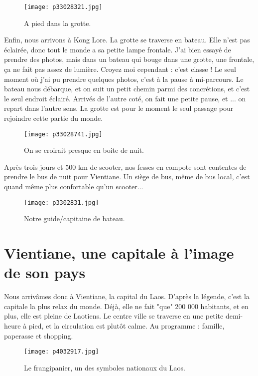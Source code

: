 \documentclass{book}
\begin{document}
\begin{figure}[h]
\centering
\texttt{[image: p33028321.jpg]}
\caption*{A pied dans la grotte.}
\end{figure}

Enfin, nous arrivons à Kong Lore. La grotte se traverse en bateau. Elle n'est pas éclairée, donc tout le monde a sa petite lampe frontale. J'ai bien essayé de prendre des photos, mais dans un bateau qui bouge dans une grotte, une frontale, ça ne fait pas assez de lumière. Croyez moi cependant : c'est classe ! Le seul moment où j'ai pu prendre quelques photos, c'est à la pause à mi-parcours. Le bateau nous débarque, et on suit un petit chemin parmi des concrétions, et c'est le seul endroit éclairé. Arrivés de l'autre coté, on fait une petite pause, et ... on repart dans l'autre sens. La grotte est pour le moment le seul passage pour rejoindre cette partie du monde.


\begin{figure}[h]
\centering
\texttt{[image: p33028741.jpg]}
\caption*{On se croirait presque en boite de nuit.}
\end{figure}

Après trois jours et 500 km de scooter, nos fesses en compote sont contentes de prendre le bus de nuit pour Vientiane. Un siège de bus, même de bus local, c'est quand même plus confortable qu'un scooter...


\begin{figure}[h]
\centering
\texttt{[image: p3302831.jpg]}
\caption*{Notre guide/capitaine de bateau.}
\end{figure}



\chapter{Vientiane, une capitale à l'image de son pays}
Nous arrivâmes donc à Vientiane, la capital du Laos. D'après la légende, c'est la capitale la plus relax du monde. Déjà, elle ne fait "que" 200 000 habitants, et en plus, elle est pleine de Laotiens. Le centre ville se traverse en une petite demi-heure à pied, et la circulation est plutôt calme. Au programme : famille, paperasse et shopping.


\begin{figure}[h]
\centering
\texttt{[image: p4032917.jpg]}
\caption*{Le frangipanier, un des symboles nationaux du Laos.}
\end{figure}
\end{document}
